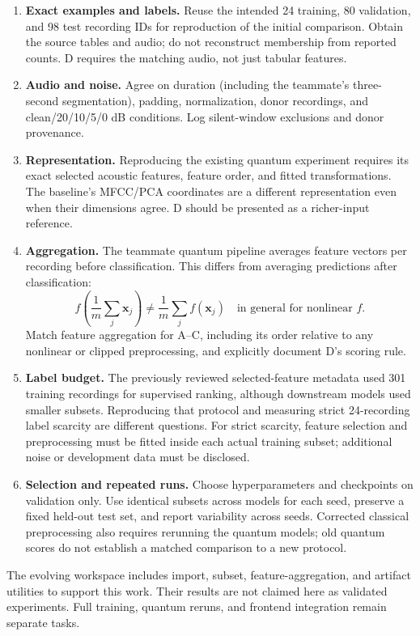 \documentclass[11pt,letterpaper]{article}
\begin{document}
\begin{enumerate}
 \item \textbf{Exact examples and labels.} Reuse the intended 24 training,
 80 validation, and 98 test recording IDs for reproduction of the initial
 comparison. Obtain the source tables and audio; do not reconstruct membership
 from reported counts. D requires the matching audio, not just tabular features.
 \item \textbf{Audio and noise.} Agree on duration (including the teammate's
 three-second segmentation), padding, normalization, donor recordings, and
 clean/20/10/5/0 dB conditions. Log silent-window exclusions and donor provenance.
 \item \textbf{Representation.} Reproducing the existing quantum experiment
 requires its exact selected acoustic features, feature order, and fitted
 transformations. The baseline's MFCC/PCA coordinates are a different
 representation even when their dimensions agree. D should be presented as a
 richer-input reference.
 \item \textbf{Aggregation.} The teammate quantum pipeline averages feature
 vectors per recording before classification. This differs from averaging
 predictions after classification:
 \[
 f\!\left(\frac{1}{m}\sum_j\mathbf{x}_j\right)
 \ne \frac{1}{m}\sum_j f(\mathbf{x}_j)
 \quad\text{in general for nonlinear }f.
 \]
 Match feature aggregation for A--C, including its order relative to any
 nonlinear or clipped preprocessing, and explicitly document D's scoring rule.
 \item \textbf{Label budget.} The previously reviewed selected-feature metadata
 used 301 training recordings for supervised ranking, although downstream
 models used smaller subsets. Reproducing that protocol and measuring strict
 24-recording label scarcity are different questions. For strict scarcity,
 feature selection and preprocessing must be fitted inside each actual
 training subset; additional noise or development data must be disclosed.
 \item \textbf{Selection and repeated runs.} Choose hyperparameters and
 checkpoints on validation only. Use identical subsets across models for each
 seed, preserve a fixed held-out test set, and report variability across seeds.
 Corrected classical preprocessing also requires rerunning the quantum models;
 old quantum scores do not establish a matched comparison to a new protocol.
\end{enumerate}
The evolving workspace includes import, subset, feature-aggregation, and
artifact utilities to support this work. Their results are not claimed here as
validated experiments. Full training, quantum reruns, and frontend integration
remain separate tasks.
\end{document}
